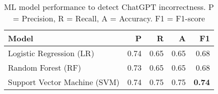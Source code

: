 \begin{table}[]
    \centering
    \caption{ML model performance to detect ChatGPT incorrectness. P = Precision, R = Recall, A = Accuracy. F1 = F1-score}
    \label{tab:model_accuracy}

    \begin{tabular}{lrrrr}
    \toprule
     \textbf{Model} & \textbf{P} & \textbf{R} & \textbf{A} & \textbf{F1} \\ \midrule
    Logistic Regression (LR) & 0.74 & 0.65 & 0.65 & 0.68 \\ 
    Random Forest (RF) & 0.73 & 0.65 & 0.65 & 0.68 \\ 
    Support Vector Machine (SVM) & 0.74 & 0.75 & 0.75 & \textbf{0.74} \\ 
        
    \bottomrule
    \end{tabular}
\end{table}